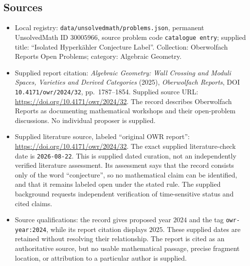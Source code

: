 \documentclass[11pt]{article}
\begin{document}
\subsection{Sources}
\begin{itemize}
\item Local registry: \texttt{data/unsolvedmath/problems.json}, permanent UnsolvedMath ID \(30005966\), source problem code \texttt{catalogue entry}; supplied title: ``Isolated Hyperkähler Conjecture Label''. Collection: Oberwolfach Reports Open Problems; category: Algebraic Geometry.
\item Supplied report citation: \emph{Algebraic Geometry: Wall Crossing and Moduli Spaces, Varieties and Derived Categories} (2025), \emph{Oberwolfach Reports}, DOI \texttt{10.4171/owr/2024/32}, pp.~1787--1854. Supplied source URL: \url{https://doi.org/10.4171/owr/2024/32}. The record describes Oberwolfach Reports as documenting mathematical workshops and their open-problem discussions. No individual proposer is supplied.
\item Supplied literature source, labeled ``original OWR report'': \url{https://doi.org/10.4171/owr/2024/32}. The exact supplied literature-check date is \texttt{2026-08-22}. This is supplied dated curation, not an independently verified literature assessment. Its assessment says that the record consists only of the word ``conjecture'', so no mathematical claim can be identified, and that it remains labeled open under the stated rule. The supplied background requests independent verification of time-sensitive status and cited claims.
\item Source qualifications: the record gives proposed year \(2024\) and the tag \texttt{owr-year:2024}, while its report citation displays \(2025\). These supplied dates are retained without resolving their relationship. The report is cited as an authoritative source, but no usable mathematical passage, precise fragment location, or attribution to a particular author is supplied.
\end{itemize}
\end{document}
